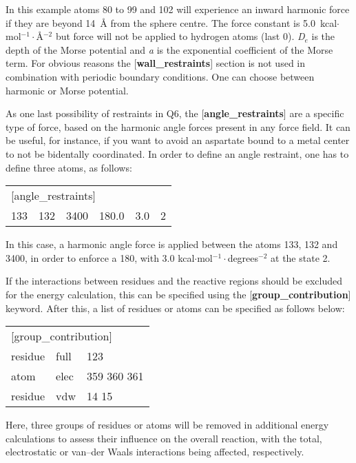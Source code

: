 \documentclass[a4paper,11pt]{article}
\begin{document}
In this example atoms 80 to 99 and 102 will experience an inward harmonic force
if they are beyond 14~{\AA} from the sphere centre. The force constant is
5.0~kcal$\cdot $mol$^{-1}\cdot ${\AA}$^{-2}$ but force will not be applied to
hydrogen atoms (last 0). \emph{D$_e$} is the depth of the Morse potential and
\emph{a }is the exponential coefficient of the Morse term. For obvious reasons
the [\textbf{wall{\_}restraints}] section is not used in combination with
periodic boundary conditions. One can choose between harmonic or Morse
potential.

As one last possibility of restraints in Q6, the [\textbf{angle{\_}restraints}]
 are a specific type of force, based on the harmonic angle forces present in 
any force field. It can be useful, for instance, if you want to avoid an 
aspartate bound to a metal center to not be bidentally coordinated. In order 
to define an angle restraint, one has to define three atoms, as follows:

\begin{center}
\begin{tabularx}{\textwidth}{|l l l l l X|}
  \hline
  \multicolumn{6}{|l|}{[angle{\_}restraints]} \\
  133 & 132 & 3400 & 180.0 & 3.0 & 2 \\ \hline
\end{tabularx}
\end{center}

In this case, a harmonic angle force is applied between the atoms 133, 132 and 3400,
 in order to enforce a 180\degree, with 3.0 kcal$\cdot $mol$^{-1}\cdot ${degrees}$^{-2}$
at the state 2.

If the interactions between residues and the reactive regions should be excluded
for the energy calculation, this can be specified using the
[\textbf{group{\_}contribution}] keyword. After this, a list of residues or atoms
can be specified as follows below:
\begin{center}
	\begin{tabularx}{\textwidth}{|l l X|}
		\hline
		\multicolumn{3}{|l|}{[group{\_}contribution]} \\
		residue & full & 123 \\
		atom & elec & 359 360 361 \\
		residue & vdw & 14 15 \\ \hline
	\end{tabularx}
\end{center}
Here, three groups of residues or atoms will be removed in additional energy calculations
to assess their influence on the overall reaction, with the total, electrostatic or van--der Waals
interactions being affected, respectively.
\end{document}
